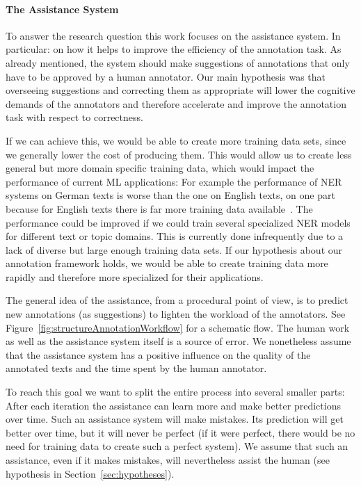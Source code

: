   \paragraph{The Assistance System}
  To answer the research question this work focuses on the assistance system. In particular: on how it helps to improve the efficiency of the annotation task. As already mentioned, the system should make suggestions of annotations that only have to be approved by a human annotator. Our main hypothesis was that overseeing suggestions and correcting them as appropriate will lower the cognitive demands of the annotators and therefore accelerate and improve the annotation task with respect to correctness.

  If we can achieve this, we would be able to create more training data sets, since we generally lower the cost of producing them. This would allow us to create less general but more domain specific training data, which would impact the performance of current \ac{ML} applications: For example the performance of \ac{NER} systems on German texts is worse than the one on English texts, on one part because for English texts there is far more training data available~\cite{agerri2016robust}. The performance could be improved if we could train several specialized \ac{NER} models for different text or topic domains. This is currently done infrequently due to a lack of diverse but large enough training data sets. If our hypothesis about our annotation framework holds, we would be able to create training data more rapidly and therefore more specialized for their applications.


  The general idea of the assistance, from a procedural point of view, is to predict new annotations (as suggestions) to lighten the workload of the annotators. See Figure~\ref{fig:structureAnnotationWorkflow} for a schematic flow. The human work as well as the assistance system itself is a source of error. We nonetheless assume that the assistance system has a positive influence on the quality of the annotated texts and the time spent by the human annotator.

  To reach this goal we want to split the entire process into several smaller parts: After each iteration the assistance can learn more and make better predictions over time. Such an assistance system will make mistakes. Its prediction will get better over time, but it will never be perfect (if it were perfect, there would be no need for training data to create such a perfect system). We assume that such an assistance, even if it makes mistakes, will nevertheless assist the human (see hypothesis in Section~\ref{sec:hypotheses}).

